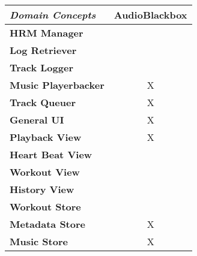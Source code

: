 \begin{center}
    \begin{tabular}{|l|c|}
        \hline
        \textit{Domain Concepts}    &   \textbf{AudioBlackbox}
        \\ \hline

\textbf{HRM Manager}        &       \\ \hline
\textbf{Log Retriever}      &       \\ \hline
\textbf{Track Logger}       &       \\ \hline
\textbf{Music Playerbacker} &   X   \\ \hline
\textbf{Track Queuer}       &   X   \\ \hline
\textbf{General UI}         &   X   \\ \hline
\textbf{Playback View}      &   X   \\ \hline
\textbf{Heart Beat View}    &       \\ \hline
\textbf{Workout View}       &       \\ \hline
\textbf{History View}       &       \\ \hline
\textbf{Workout Store}      &       \\ \hline
\textbf{Metadata Store}     &   X   \\ \hline
\textbf{Music Store}        &   X   \\ \hline

    \end{tabular}
\end{center}
